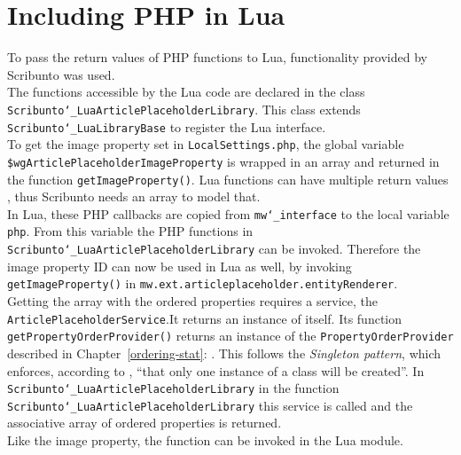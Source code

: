 \section{Including PHP in Lua}\label{including-lua}

To pass the return values of PHP functions to Lua, functionality provided by Scribunto was used. \\
The functions accessible by the Lua code are declared in the class \texttt{\justify Scribunto\char`_LuaArticlePlaceholderLibrary}. This class extends \texttt{\justify Scribunto\char`_LuaLibraryBase} to register the Lua interface. \\
To get the image property set in \texttt{\justify LocalSettings.php}, the global variable \texttt{\justify \$wgArticlePlaceholderImageProperty} is wrapped in an array and returned in the function \texttt{\justify getImageProperty()}. Lua functions can have multiple return values \citep{luabook:01}, thus Scribunto needs an array to model that. \\
In Lua, these PHP callbacks are copied from \texttt{\justify mw\char`_interface} to the local variable \texttt{php}. From this variable the PHP functions in \texttt{\justify Scribunto\char`_LuaArticlePlaceholderLibrary} can be invoked. Therefore the image property ID can now be used in Lua as well, by invoking \texttt{\justify getImageProperty()} in \texttt{\justify mw.ext.articleplaceholder.entityRenderer}. \\
Getting the array with the ordered properties requires a service, the \texttt{ArticlePlaceholderService}.It returns an instance of itself. Its function \texttt{\justify getPropertyOrderProvider()} returns an instance of the \texttt{\justify PropertyOrderProvider} described in Chapter~\ref{ordering-stat}: . This follows the \textit{Singleton pattern}, which enforces, according to \citet{designpattern}, ``that only one instance of a class will be created''.
In \texttt{\justify Scribunto\char`_LuaArticlePlaceholderLibrary} in the function \texttt{\justify Scribunto\char`_LuaArticlePlaceholderLibrary} this service is called and the associative array of ordered properties is returned.\\
Like the image property, the function can be invoked in the Lua module.
